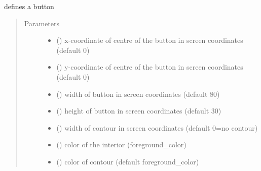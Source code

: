\documentclass[letterpaper,10pt,english]{sphinxmanual}
\begin{document}

\begin{fulllineitems}
\label{\detokenize{Reference:salabim.AnimateButton}}
defines a button
\begin{quote}\begin{description}
\item[{Parameters}] \leavevmode\begin{itemize}
\item {} 
 () \textendash{} x-coordinate of centre of the button in screen coordinates (default 0)

\item {} 
 () \textendash{} y-coordinate of centre of the button in screen coordinates (default 0)

\item {} 
 () \textendash{} width of button in screen coordinates (default 80)

\item {} 
 () \textendash{} height of button in screen coordinates (default 30)

\item {} 
 () \textendash{} width of contour in screen coordinates (default 0=no contour)

\item {} 
 () \textendash{} color of the interior (foreground\_color)

\item {} 
 () \textendash{} color of contour (default foreground\_color)


\end{itemize}
\end{description}
\end{quote}
\end{fulllineitems}
\end{document}

